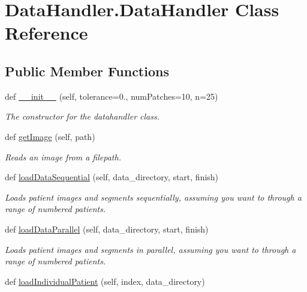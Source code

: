 \hypertarget{classDataHandler_1_1DataHandler}{}\section{Data\+Handler.\+Data\+Handler Class Reference}
\label{classDataHandler_1_1DataHandler}
\subsection*{Public Member Functions}
\begin{DoxyCompactItemize}
\item 
def \mbox{\hyperlink{classDataHandler_1_1DataHandler_a5ae953a5294d5fd61aec676a5ee41de1}{\+\_\+\+\_\+init\+\_\+\+\_\+}} (self, tolerance=0., num\+Patches=10, n=25)
\begin{DoxyCompactList}\small\item\em The constructor for the datahandler class. \end{DoxyCompactList}\item 
def \mbox{\hyperlink{classDataHandler_1_1DataHandler_a450a64dad593d331764744b305818d0d}{get\+Image}} (self, path)
\begin{DoxyCompactList}\small\item\em Reads an image from a filepath. \end{DoxyCompactList}\item 
def \mbox{\hyperlink{classDataHandler_1_1DataHandler_a66caabe029fda9a6c6c70c0c119e331a}{load\+Data\+Sequential}} (self, data\+\_\+directory, start, finish)
\begin{DoxyCompactList}\small\item\em Loads patient images and segments sequentially, assuming you want to through a range of numbered patients. \end{DoxyCompactList}\item 
def \mbox{\hyperlink{classDataHandler_1_1DataHandler_a88c08a978b49e86c4a4def7b781cb6c2}{load\+Data\+Parallel}} (self, data\+\_\+directory, start, finish)
\begin{DoxyCompactList}\small\item\em Loads patient images and segments in parallel, assuming you want to through a range of numbered patients. \end{DoxyCompactList}\item 
def \mbox{\hyperlink{classDataHandler_1_1DataHandler_afd07d906302728fe91913f71b8f78995}{load\+Individual\+Patient}} (self, index, data\+\_\+directory)

\end{DoxyCompactItemize}
